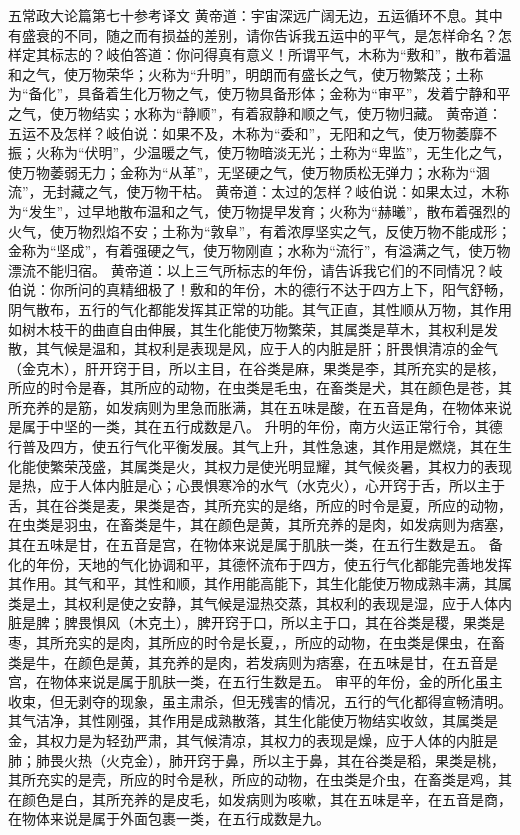 \documentclass[a4paper,12pt,UTF8,twoside]{ctexbook}
\begin{document}
五常政大论篇第七十参考译文
黄帝道：宇宙深远广阔无边，五运循环不息。其中有盛衰的不同，随之而有损益的差别，请你告诉我五运中的平气，是怎样命名？怎样定其标志的？岐伯答道：你问得真有意义！所谓平气，木称为“敷和”，散布着温和之气，使万物荣华；火称为“升明”，明朗而有盛长之气，使万物繁茂；土称为“备化”，具备着生化万物之气，使万物具备形体；金称为“审平”，发着宁静和平之气，使万物结实；水称为“静顺”，有着寂静和顺之气，使万物归藏。
黄帝道：五运不及怎样？岐伯说：如果不及，木称为“委和”，无阳和之气，使万物萎靡不振；火称为“伏明”，少温暖之气，使万物暗淡无光；土称为“卑监”，无生化之气，使万物萎弱无力；金称为“从革”，无坚硬之气，使万物质松无弹力；水称为“涸流”，无封藏之气，使万物干枯。
黄帝道：太过的怎样？岐伯说：如果太过，木称为“发生”，过早地散布温和之气，使万物提早发育；火称为“赫曦”，散布着强烈的火气，使万物烈焰不安；土称为“敦阜”，有着浓厚坚实之气，反使万物不能成形；金称为“坚成”，有着强硬之气，使万物刚直；水称为“流行”，有溢满之气，使万物漂流不能归宿。
黄帝道：以上三气所标志的年份，请告诉我它们的不同情况？岐伯说：你所问的真精细极了！敷和的年份，木的德行不达于四方上下，阳气舒畅，阴气散布，五行的气化都能发挥其正常的功能。其气正直，其性顺从万物，其作用如树木枝干的曲直自由伸展，其生化能使万物繁荣，其属类是草木，其权利是发散，其气候是温和，其权利是表现是风，应于人的内脏是肝；肝畏惧清凉的金气（金克木），肝开窍于目，所以主目，在谷类是麻，果类是李，其所充实的是核，所应的时令是春，其所应的动物，在虫类是毛虫，在畜类是犬，其在颜色是苍，其所充养的是筋，如发病则为里急而胀满，其在五味是酸，在五音是角，在物体来说是属于中坚的一类，其在五行成数是八。
升明的年份，南方火运正常行令，其德行普及四方，使五行气化平衡发展。其气上升，其性急速，其作用是燃烧，其在生化能使繁荣茂盛，其属类是火，其权力是使光明显耀，其气候炎暑，其权力的表现是热，应于人体内脏是心；心畏惧寒冷的水气（水克火），心开窍于舌，所以主于舌，其在谷类是麦，果类是杏，其所充实的是络，所应的时令是夏，所应的动物，在虫类是羽虫，在畜类是牛，其在颜色是黄，其所充养的是肉，如发病则为痞塞，其在五味是甘，在五音是宫，在物体来说是属于肌肤一类，在五行生数是五。
备化的年份，天地的气化协调和平，其德怀流布于四方，使五行气化都能完善地发挥其作用。其气和平，其性和顺，其作用能高能下，其生化能使万物成熟丰满，其属类是土，其权利是使之安静，其气候是湿热交蒸，其权利的表现是湿，应于人体内脏是脾；脾畏惧风（木克土），脾开窍于口，所以主于口，其在谷类是稷，果类是枣，其所充实的是肉，其所应的时令是长夏，，所应的动物，在虫类是倮虫，在畜类是牛，在颜色是黄，其充养的是肉，若发病则为痞塞，在五味是甘，在五音是宫，在物体来说是属于肌肤一类，在五行生数是五。
审平的年份，金的所化虽主收束，但无剥夺的现象，虽主肃杀，但无残害的情况，五行的气化都得宣畅清明。其气洁净，其性刚强，其作用是成熟散落，其生化能使万物结实收敛，其属类是金，其权力是为轻劲严肃，其气候清凉，其权力的表现是燥，应于人体的内脏是肺；肺畏火热（火克金），肺开窍于鼻，所以主于鼻，其在谷类是稻，果类是桃，其所充实的是壳，所应的时令是秋，所应的动物，在虫类是介虫，在畜类是鸡，其在颜色是白，其所充养的是皮毛，如发病则为咳嗽，其在五味是辛，在五音是商，在物体来说是属于外面包裹一类，在五行成数是九。
\end{document}
